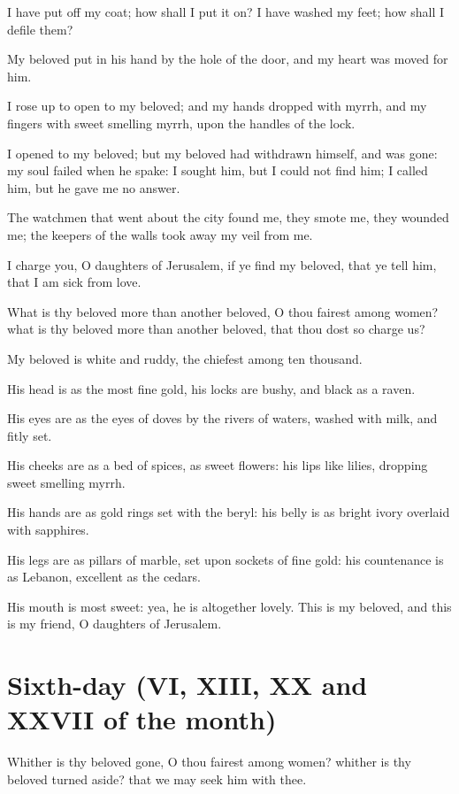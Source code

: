\documentclass[0main.tex]{subfiles}
\begin{document}
I have put off my coat; how shall I put it on? I have washed my feet; how shall I defile them?

My beloved put in his hand by the hole of the door, and my heart was moved for him.

I rose up to open to my beloved; and my hands dropped with myrrh, and my fingers with sweet smelling myrrh, upon the handles of the lock.

I opened to my beloved; but my beloved had withdrawn himself, and was gone: my soul failed when he spake: I sought him, but I could not find him; I called him, but he gave me no answer.

The watchmen that went about the city found me, they smote me, they wounded me; the keepers of the walls took away my veil from me.

I charge you, O daughters of Jerusalem, if ye find my beloved, that ye tell him, that I am sick from love.

What is thy beloved more than another beloved, O thou fairest among women? what is thy beloved more than another beloved, that thou dost so charge us?

My beloved is white and ruddy, the chiefest among ten thousand.

His head is as the most fine gold, his locks are bushy, and black as a raven.

His eyes are as the eyes of doves by the rivers of waters, washed with milk, and fitly set.

His cheeks are as a bed of spices, as sweet flowers: his lips like lilies, dropping sweet smelling myrrh.

His hands are as gold rings set with the beryl: his belly is as bright ivory overlaid with sapphires.

His legs are as pillars of marble, set upon sockets of fine gold: his countenance is as Lebanon, excellent as the cedars.

His mouth is most sweet: yea, he is altogether lovely. This is my beloved, and this is my friend, O daughters of Jerusalem.

\section*{Sixth-day (VI, XIII, XX and XXVII of the month)}

Whither is thy beloved gone, O thou fairest among women? whither is thy beloved turned aside? that we may seek him with thee.
\end{document}
